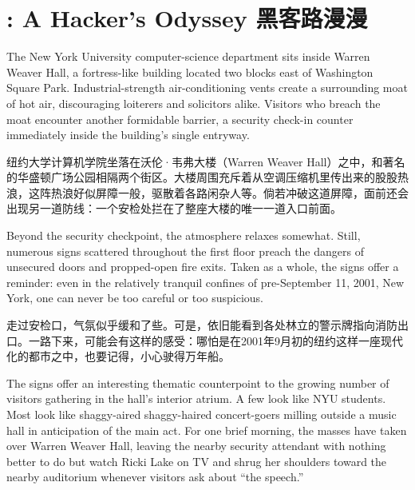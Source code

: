 \chapter{\ifdefined{}: A Hacker's Odyssey
\fi
\ifdefined\chs
黑客路漫漫
\fi}
\thispagestyle{empty}
\ifdefined\eng
The New York University computer-science department sits inside Warren Weaver Hall, a fortress-like building located two blocks east of Washington Square Park. Industrial-strength air-conditioning vents create a surrounding moat of hot air, discouraging loiterers and solicitors alike. Visitors who breach the moat encounter another formidable barrier, a security check-in counter immediately inside the building's single entryway.
\fi

\ifdefined\chs
纽约大学计算机学院坐落在沃伦·韦弗大楼（Warren Weaver Hall）之中，和著名的华盛顿广场公园相隔两个街区。大楼周围充斥着从空调压缩机里传出来的股股热浪，这阵热浪好似屏障一般，驱散着各路闲杂人等。倘若冲破这道屏障，面前还会出现另一道防线：一个安检处拦在了整座大楼的唯一一道入口前面。
\fi

\ifdefined\eng
Beyond the security checkpoint, the atmosphere relaxes somewhat. Still, numerous signs scattered throughout the first floor preach the dangers of unsecured doors and propped-open fire exits. Taken as a whole, the signs offer a reminder: even in the relatively tranquil confines of pre-September 11, 2001, New York, one can never be too careful or too suspicious.
\fi

\ifdefined\chs
走过安检口，气氛似乎缓和了些。可是，依旧能看到各处林立的警示牌指向消防出口。一路下来，可能会有这样的感受：哪怕是在2001年9月初的纽约这样一座现代化的都市之中，也要记得，小心驶得万年船。
\fi

\ifdefined\eng
The signs offer an interesting thematic counterpoint to the growing number of visitors gathering in the hall's interior atrium. A few look like NYU students. Most look like \ifdefined\vone shaggy-aired \fi\ifdefined\vtwo shaggy-haired \fi concert-goers milling outside a music hall in anticipation of the main act. For one brief morning, the masses have taken over Warren Weaver Hall, leaving the nearby security attendant with nothing better to do but watch Ricki Lake on TV and shrug her shoulders toward the nearby auditorium whenever visitors ask about ``the speech.''
\fi

